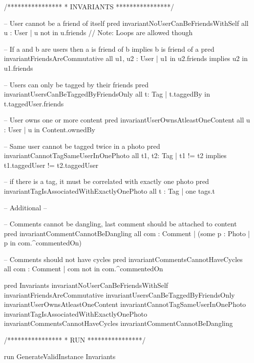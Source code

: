 \begin{enumerate}
\begin{alloy}
/****************
 * INVARIANTS 
 ****************/

-- User cannot be a friend of itself
pred invariantNoUserCanBeFriendsWithSelf {
  all u : User | u not in u.friends // Note: Loops are allowed though
}

-- If a and b are users then a is friend of b implies b is friend of a
pred invariantFriendsAreCommutative {
  all u1, u2 : User | u1 in u2.friends implies u2 in u1.friends
}

-- Users can only be tagged by their friends
pred invariantUsersCanBeTaggedByFriendsOnly {
  all  t: Tag | t.taggedBy in t.taggedUser.friends
}

-- User owns one or more content
pred invariantUserOwnsAtleastOneContent {
  all u : User | u in Content.ownedBy
}

-- Same user cannot be tagged twice in a photo
pred invariantCannotTagSameUserInOnePhoto {
  all t1, t2: Tag | t1 != t2 implies t1.taggedUser != t2.taggedUser 
}

-- if there is a tag, it must be correlated with exactly one photo
pred invariantTagIsAssociatedWithExactlyOnePhoto {
  all t : Tag | one tags.t
}

-- Additional --

-- Comments cannot be dangling, last comment should be attached to content
pred invariantCommentCannotBeDangling {
  all com : Comment | (some p : Photo | p in com.^commentedOn)
}

-- Comments should not have cycles
pred invariantCommentsCannotHaveCycles {
  all com : Comment | com not in com.^commentedOn
}

pred Invariants {
  invariantNoUserCanBeFriendsWithSelf
  invariantFriendsAreCommutative
  invariantUsersCanBeTaggedByFriendsOnly
  invariantUserOwnsAtleastOneContent
  invariantCannotTagSameUserInOnePhoto
  invariantTagIsAssociatedWithExactlyOnePhoto
  invariantCommentsCannotHaveCycles
  invariantCommentCannotBeDangling
}

/****************
 * RUN 
 ****************/

run GenerateValidInstance {
  Invariants
}
          \end{alloy}
\end{enumerate}
